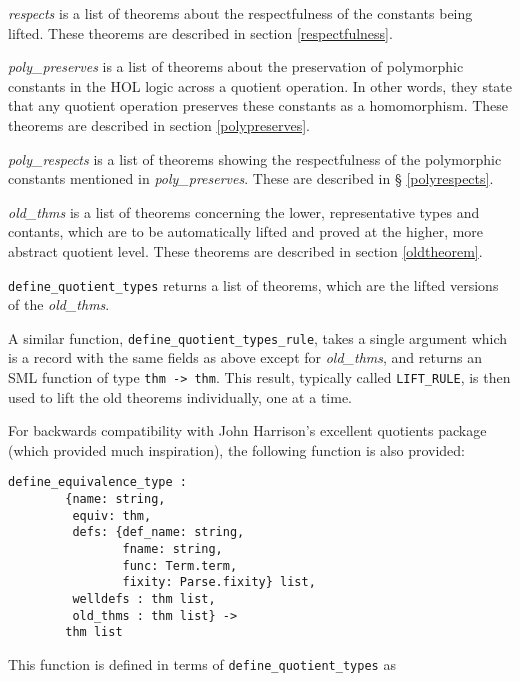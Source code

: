 \documentclass[envcountsame,runningheads]{llncs}
\begin{document}
{\it respects\/} is a list of theorems about the respectfulness of the
constants being lifted. 
These theorems are described in section 
\ref{respectfulness}.

{\it poly\_preserves\/} is a list of theorems about the preservation of
polymorphic constants in the HOL logic
across a quotient operation.
In other words, they state that any quotient operation preserves these
constants as a homomorphism.
These theorems are described in section 
\ref{polypreserves}.

{\it poly\_respects\/} is a list of theorems showing the respectfulness
of the polymorphic constants mentioned in {\it poly\_preserves}.
These are
described in
\S
\ref{polyrespects}.

{\it old\_thms\/} is a list of theorems concerning the lower, representative
types and contants, which are to be automatically lifted and proved at the
higher, more abstract quotient level.
These theorems are described in section \ref{oldtheorem}.

{\tt define\_quotient\_types} returns a list of theorems, which are the
lifted versions of the {\it old\_thms}.

A similar function,
{\tt define\_quotient\_types\_rule}, takes a single argument which is a
record with the same fields as above except for {\it old\_thms},
and returns an SML function of type {\tt thm -> thm}. 
This result, typically called {\tt LIFT\_RULE},
is then used to lift the old theorems individually, one at a time.

For backwards compatibility with John Harrison's excellent quotients package \cite{Har98}
(which provided much inspiration),
the following function is also provided:

\begin{verbatim}
define_equivalence_type : 
        {name: string,
         equiv: thm,
         defs: {def_name: string,
                fname: string,
                func: Term.term,
                fixity: Parse.fixity} list,
         welldefs : thm list,
         old_thms : thm list} ->
        thm list
\end{verbatim}

\noindent
This function is defined in terms of {\tt define\_quotient\_types} as
\end{document}
